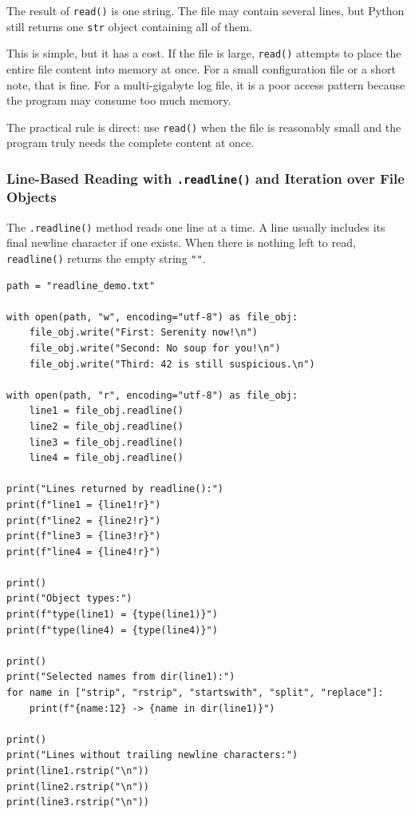 The result of \texttt{read()} is one string. The file may contain several lines, but Python still returns one \texttt{str} object containing all of them.

This is simple, but it has a cost. If the file is large, \texttt{read()} attempts to place the entire file content into memory at once. For a small configuration file or a short note, that is fine. For a multi-gigabyte log file, it is a poor access pattern because the program may consume too much memory.

The practical rule is direct: use \texttt{read()} when the file is reasonably small and the program truly needs the complete content at once.

\subsubsection{Line-Based Reading with \texttt{.readline()} and Iteration over File Objects}

The \texttt{.readline()} method reads one line at a time. A line usually includes its final newline character if one exists. When there is nothing left to read, \texttt{readline()} returns the empty string \texttt{""}.

\begin{verbatim}
path = "readline_demo.txt"

with open(path, "w", encoding="utf-8") as file_obj:
    file_obj.write("First: Serenity now!\n")
    file_obj.write("Second: No soup for you!\n")
    file_obj.write("Third: 42 is still suspicious.\n")

with open(path, "r", encoding="utf-8") as file_obj:
    line1 = file_obj.readline()
    line2 = file_obj.readline()
    line3 = file_obj.readline()
    line4 = file_obj.readline()

print("Lines returned by readline():")
print(f"line1 = {line1!r}")
print(f"line2 = {line2!r}")
print(f"line3 = {line3!r}")
print(f"line4 = {line4!r}")

print()
print("Object types:")
print(f"type(line1) = {type(line1)}")
print(f"type(line4) = {type(line4)}")

print()
print("Selected names from dir(line1):")
for name in ["strip", "rstrip", "startswith", "split", "replace"]:
    print(f"{name:12} -> {name in dir(line1)}")

print()
print("Lines without trailing newline characters:")
print(line1.rstrip("\n"))
print(line2.rstrip("\n"))
print(line3.rstrip("\n"))
\end{verbatim}

